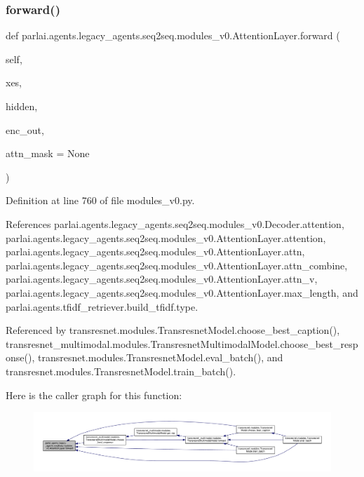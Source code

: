 \subsubsection{\texorpdfstring{forward()}{forward()}}
{\footnotesize\ttfamily def parlai.\+agents.\+legacy\+\_\+agents.\+seq2seq.\+modules\+\_\+v0.\+Attention\+Layer.\+forward (\begin{DoxyParamCaption}\item[{}]{self,  }\item[{}]{xes,  }\item[{}]{hidden,  }\item[{}]{enc\+\_\+out,  }\item[{}]{attn\+\_\+mask = {\ttfamily None} }\end{DoxyParamCaption})}



Definition at line 760 of file modules\+\_\+v0.\+py.



References parlai.\+agents.\+legacy\+\_\+agents.\+seq2seq.\+modules\+\_\+v0.\+Decoder.\+attention, parlai.\+agents.\+legacy\+\_\+agents.\+seq2seq.\+modules\+\_\+v0.\+Attention\+Layer.\+attention, parlai.\+agents.\+legacy\+\_\+agents.\+seq2seq.\+modules\+\_\+v0.\+Attention\+Layer.\+attn, parlai.\+agents.\+legacy\+\_\+agents.\+seq2seq.\+modules\+\_\+v0.\+Attention\+Layer.\+attn\+\_\+combine, parlai.\+agents.\+legacy\+\_\+agents.\+seq2seq.\+modules\+\_\+v0.\+Attention\+Layer.\+attn\+\_\+v, parlai.\+agents.\+legacy\+\_\+agents.\+seq2seq.\+modules\+\_\+v0.\+Attention\+Layer.\+max\+\_\+length, and parlai.\+agents.\+tfidf\+\_\+retriever.\+build\+\_\+tfidf.\+type.



Referenced by transresnet.\+modules.\+Transresnet\+Model.\+choose\+\_\+best\+\_\+caption(), transresnet\+\_\+multimodal.\+modules.\+Transresnet\+Multimodal\+Model.\+choose\+\_\+best\+\_\+response(), transresnet.\+modules.\+Transresnet\+Model.\+eval\+\_\+batch(), and transresnet.\+modules.\+Transresnet\+Model.\+train\+\_\+batch().

Here is the caller graph for this function\+:
\nopagebreak
\begin{figure}[H]
\begin{center}
\leavevmode
\includegraphics[width=350pt]{classparlai_1_1agents_1_1legacy__agents_1_1seq2seq_1_1modules__v0_1_1AttentionLayer_a6b5727eb84f3cab62adc1c647e23b98a_icgraph}
\end{center}
\end{figure}


